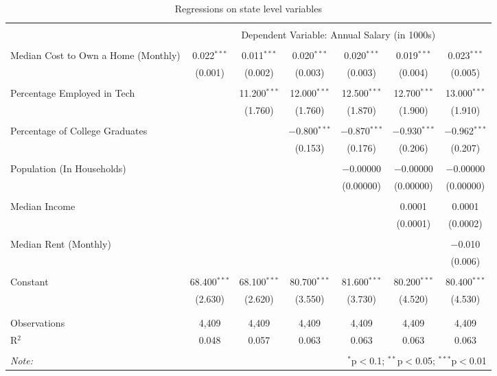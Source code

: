 
\begin{table}[!htbp] \centering 
  \caption{Regressions on state level variables} 
  \label{} 
\footnotesize 
\begin{tabular}{@{\extracolsep{5pt}}lcccccc} 
\\[-1.8ex]\hline 
\hline \\[-1.8ex] 
 & \multicolumn{6}{c}{Dependent Variable: Annual Salary (in 1000s)} \\ 
\cline{2-7} 
\hline \\[-1.8ex] 
 Median Cost to Own a Home (Monthly) & 0.022$^{***}$ & 0.011$^{***}$ & 0.020$^{***}$ & 0.020$^{***}$ & 0.019$^{***}$ & 0.023$^{***}$ \\ 
  & (0.001) & (0.002) & (0.003) & (0.003) & (0.004) & (0.005) \\ 
  & & & & & & \\ 
 Percentage Employed in Tech &  & 11.200$^{***}$ & 12.000$^{***}$ & 12.500$^{***}$ & 12.700$^{***}$ & 13.000$^{***}$ \\ 
  &  & (1.760) & (1.760) & (1.870) & (1.900) & (1.910) \\ 
  & & & & & & \\ 
 Percentage of College Graduates &  &  & $-$0.800$^{***}$ & $-$0.870$^{***}$ & $-$0.930$^{***}$ & $-$0.962$^{***}$ \\ 
  &  &  & (0.153) & (0.176) & (0.206) & (0.207) \\ 
  & & & & & & \\ 
 Population (In Households) &  &  &  & $-$0.00000 & $-$0.00000 & $-$0.00000 \\ 
  &  &  &  & (0.00000) & (0.00000) & (0.00000) \\ 
  & & & & & & \\ 
 Median Income &  &  &  &  & 0.0001 & 0.0001 \\ 
  &  &  &  &  & (0.0001) & (0.0002) \\ 
  & & & & & & \\ 
 Median Rent (Monthly) &  &  &  &  &  & $-$0.010 \\ 
  &  &  &  &  &  & (0.006) \\ 
  & & & & & & \\ 
 Constant & 68.400$^{***}$ & 68.100$^{***}$ & 80.700$^{***}$ & 81.600$^{***}$ & 80.200$^{***}$ & 80.400$^{***}$ \\ 
  & (2.630) & (2.620) & (3.550) & (3.730) & (4.520) & (4.530) \\ 
  & & & & & & \\ 
\hline \\[-1.8ex] 
Observations & 4,409 & 4,409 & 4,409 & 4,409 & 4,409 & 4,409 \\ 
R$^{2}$ & 0.048 & 0.057 & 0.063 & 0.063 & 0.063 & 0.063 \\ 
\hline 
\hline \\[-1.8ex] 
\textit{Note:}  & \multicolumn{6}{r}{$^{*}$p$<$0.1; $^{**}$p$<$0.05; $^{***}$p$<$0.01} \\ 
\end{tabular} 
\end{table} 
